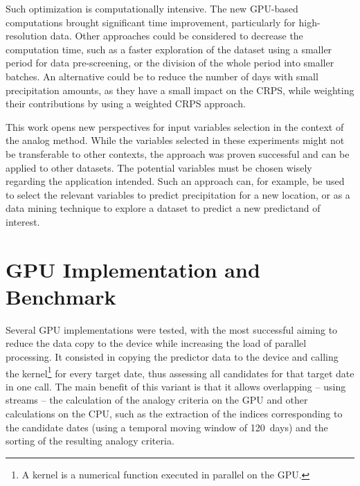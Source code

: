 \documentclass[draft]{agujournal2019}
\begin{document}
Such optimization is computationally intensive. The new GPU-based computations brought significant time improvement, particularly for high-resolution data. Other approaches could be considered to decrease the computation time, such as a faster exploration of the dataset using a smaller period for data pre-screening, or the division of the whole period into smaller batches. An alternative could be to reduce the number of days with small precipitation amounts, as they have a small impact on the CRPS, while weighting their contributions by using a weighted CRPS approach.

This work opens new perspectives for input variables selection in the context of the analog method. While the variables selected in these experiments might not be transferable to other contexts, the approach was proven successful and can be applied to other datasets. The potential variables must be chosen wisely regarding the application intended. Such an approach can, for example, be used to select the relevant variables to predict precipitation for a new location, or as a data mining technique to explore a dataset to predict a new predictand of interest.


%
%

\FloatBarrier

\appendix

\section{GPU Implementation and Benchmark}

Several GPU implementations were tested, with the most successful aiming to reduce the data copy to the device while increasing the load of parallel processing. It consisted in copying the predictor data to the device and calling the kernel\footnote{A kernel is a numerical function executed in parallel on the GPU.} for every target date, thus assessing all candidates for that target date in one call. The main benefit of this variant is that it allows overlapping -- using streams -- the calculation of the analogy criteria on the GPU and other calculations on the CPU, such as the extraction of the indices corresponding to the candidate dates (using a temporal moving window of 120~days) and the sorting of the resulting analogy criteria.
\end{document}
